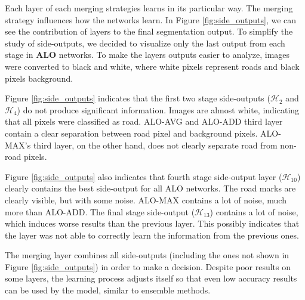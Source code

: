 Each layer of each merging strategies learns in its particular way. The merging strategy influences how the networks learn. In Figure \ref{fig:side_outputs}, we can see the contribution of layers to the final segmentation output. To simplify the study of side-outputs, we decided to visualize only the last  output from each stage in \textbf{ALO} networks. To make the layers outputs easier to analyze, images were converted to black and white, where white pixels represent roads and black pixels background.









Figure \ref{fig:side_outputs} indicates that the first two stage side-outputs ($\mathcal{H}_2$ and $\mathcal{H}_4$) do not produce significant information. Images are almost white, indicating that all pixels were classified as road. ALO-AVG and ALO-ADD third layer contain a clear separation between road pixel and background pixels. ALO-MAX's third layer, on the other hand, does not clearly separate road from non-road pixels. 

Figure \ref{fig:side_outputs} also indicates that fourth stage side-output layer ($\mathcal{H}_{10}$) clearly contains the best side-output for all ALO networks. The road marks are clearly visible, but with some noise. ALO-MAX contains a lot of noise, much more than ALO-ADD. The final stage side-output ($\mathcal{H}_{13}$) contains a lot of noise, which induces worse results than the previous layer. This possibly indicates that the layer was not able to correctly learn the information from the previous ones.

The merging layer combines all side-outputs (including the ones not shown in Figure \ref{fig:side_outputs}) in order to make a decision. Despite poor results on some layers, the learning process adjusts itself so that even low accuracy results can be used by the model, similar to ensemble methods.


